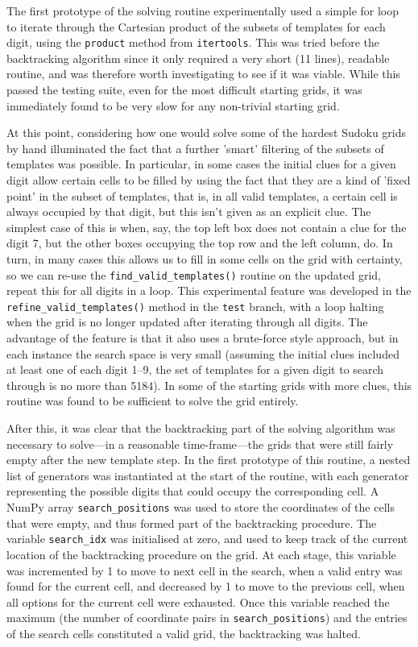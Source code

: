 \documentclass[12pt]{article}
\begin{document}
The first prototype of the solving routine experimentally used a simple for loop to iterate through the Cartesian product of the subsets of templates for each digit, using the \texttt{product} method from \texttt{itertools}.
This was tried before the backtracking algorithm since it only required a very short (11 lines), readable routine, and was therefore worth investigating to see if it was viable.
While this passed the testing suite, even for the most difficult starting grids, it was immediately found to be very slow for any non-trivial starting grid.

At this point, considering how one would solve some of the hardest Sudoku grids by hand illuminated the fact that a further 'smart' filtering of the subsets of templates was possible.
In particular, in some cases the initial clues for a given digit allow certain cells to be filled by using the fact that they are a kind of 'fixed point' in the subset of templates, that is, in all valid templates, a certain cell is always occupied by that digit, but this isn't given as an explicit clue.
The simplest case of this is when, say, the top left box does not contain a clue for the digit 7, but the other boxes occupying the top row and the left column, do.
In turn, in many cases this allows us to fill in some cells on the grid with certainty, so we can re-use the \texttt{find\_valid\_templates()} routine on the updated grid, repeat this for all digits in a loop.
This experimental feature was developed in the \texttt{refine\_valid\_templates()} method in the \texttt{test} branch, with a loop halting when the grid is no longer updated after iterating through all digits.
The advantage of the feature is that it also uses a brute-force style approach, but in each instance the search space is very small (assuming the initial clues included at least one of each digit 1--9, the set of templates for a given digit to search through is no more than 5184).
In some of the starting grids with more clues, this routine was found to be sufficient to solve the grid entirely.

After this, it was clear that the backtracking part of the solving algorithm was necessary to solve---in a reasonable time-frame---the grids that were still fairly empty after the new template step.
In the first prototype of this routine, a nested list of generators was instantiated at the start of the routine, with each generator representing the possible digits that could occupy the corresponding cell.
A NumPy array \texttt{search\_positions} was used to store the coordinates of the cells that were empty, and thus formed part of the backtracking procedure.
The variable \texttt{search\_idx} was initialised at zero, and used to keep track of the current location of the backtracking procedure on the grid.
At each stage, this variable was incremented by 1 to move to next cell in the search, when a valid entry was found for the current cell, and decreased by 1 to move to the previous cell, when all options for the current cell were exhausted.
Once this variable reached the maximum (the number of coordinate pairs in \texttt{search\_positions}) and the entries of the search cells constituted a valid grid, the backtracking was halted.
\end{document}
